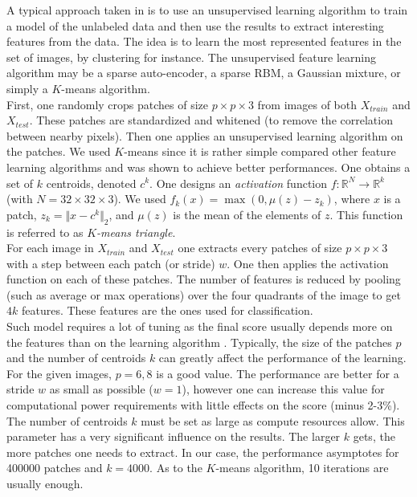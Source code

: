 \documentclass{article} %
\begin{document}
\quad 
A typical approach taken in \cite{Coates12} is to use an unsupervised learning algorithm to train a model of the unlabeled data and then use the results to extract interesting features from the data.
The idea is to learn the most represented features in the set of images, by clustering for instance. The unsupervised feature learning algorithm may be a sparse auto-encoder, a sparse RBM, a Gaussian mixture, or simply a $K$-means algorithm.\\
First, one randomly crops patches of size $p \times p \times 3$ from images of both $X_{train}$ and $X_{test}$. These patches are standardized and whitened (to remove the correlation between nearby pixels). Then one applies an unsupervised learning algorithm on the patches. We used $K$-means since it is rather simple compared other feature learning algorithms and was shown to achieve better performances. One obtains a set of $k$ centroids, denoted $c^k$. One designs an \emph{activation} function $f: \mathbb{R}^N \rightarrow \mathbb{R}^k$ (with $N=32 \times 32 \times 3$). We used $f_k(x) = \max({0,\mu(z) - z_k})$, where $x$ is a patch, $z_k = \Vert x - c^k \Vert_2$, and $\mu(z)$ is the mean of the elements of $z$. This function is referred to as \emph{$K$-means triangle}.\\
For each image in $X_{train}$ and $X_{test}$ one extracts every patches of size $p \times p \times 3$ with a step between each patch (or stride) $w$. One then applies the activation function on each of these patches. The number of features is reduced by pooling (such as average or max operations) over the four quadrants of the image to get $4k$ features. These features are the ones used for classification.\\
Such model requires a lot of tuning as the final score usually depends more on the features than on the learning algorithm \cite{coates2011analysis}. Typically, the size of the patches $p$ and the number of centroids $k$ can greatly affect the performance of the learning. For the given images, $p={6,8}$ is a good value. The performance are better for a stride $w$ as small as possible ($w=1$), however one can increase this value for computational power requirements with little effects on the score (minus 2-3\%). The number of centroids $k$ must be set as large as compute resources allow. This parameter has a very significant influence on the results. The larger $k$ gets, the more patches one needs to extract. In our case, the performance asymptotes for 400000 patches and $k=4000$. As to the $K$-means algorithm, 10 iterations are usually enough.
\end{document}
